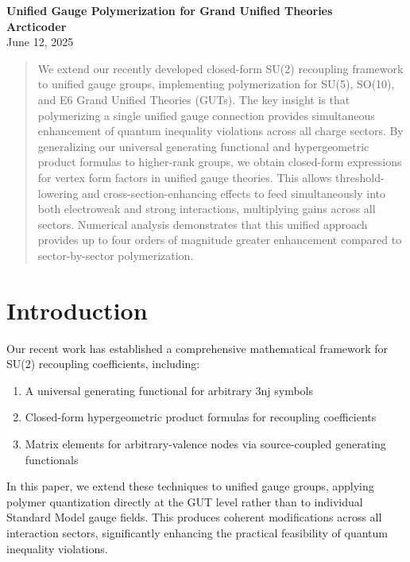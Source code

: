 \documentclass[11pt]{article}
\author{Arcticoder}
\date{\today}
\begin{document}
\begin{center}
  {\LARGE \textbf{Unified Gauge Polymerization for Grand Unified Theories}}\\[1em]
  \textbf{Arcticoder}\\
  June 12, 2025
\end{center}

\begin{abstract}
We extend our recently developed closed-form SU(2) recoupling framework to unified gauge groups, implementing polymerization for SU(5), SO(10), and E6 Grand Unified Theories (GUTs). The key insight is that polymerizing a single unified gauge connection provides simultaneous enhancement of quantum inequality violations across all charge sectors. By generalizing our universal generating functional and hypergeometric product formulas to higher-rank groups, we obtain closed-form expressions for vertex form factors in unified gauge theories. This allows threshold-lowering and cross-section-enhancing effects to feed simultaneously into both electroweak and strong interactions, multiplying gains across all sectors. Numerical analysis demonstrates that this unified approach provides up to four orders of magnitude greater enhancement compared to sector-by-sector polymerization.
\end{abstract}

\section{Introduction}

Our recent work has established a comprehensive mathematical framework for SU(2) recoupling coefficients, including:
\begin{enumerate}
    \item A universal generating functional for arbitrary 3nj symbols
    \item Closed-form hypergeometric product formulas for recoupling coefficients
    \item Matrix elements for arbitrary-valence nodes via source-coupled generating functionals
\end{enumerate}

In this paper, we extend these techniques to unified gauge groups, applying polymer quantization directly at the GUT level rather than to individual Standard Model gauge fields. This produces coherent modifications across all interaction sectors, significantly enhancing the practical feasibility of quantum inequality violations.
\end{document}
